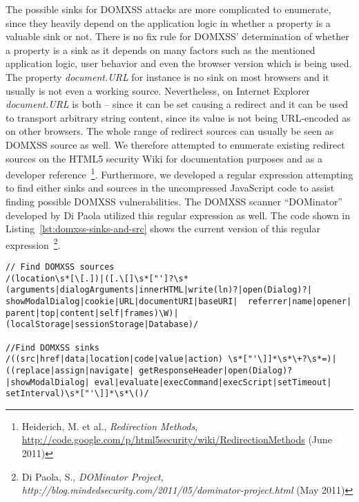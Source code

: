     The possible sinks for DOMXSS attacks are more complicated to enumerate, since they heavily depend on the application logic in whether a property is a valuable sink or not. There is no fix rule for DOMXSS' determination of whether a property is a sink as it depends on many factors such as the mentioned application logic, user behavior and even the browser version which is being used. The property \textit{document.URL} for instance is no sink on most browsers and it usually is not even a working source. Nevertheless, on Internet Explorer \textit{document.URL} is both -- since it can be set causing a redirect and it can be used to transport arbitrary string content, since its value is not being URL-encoded as on other browsers. The whole range of redirect sources can usually be seen as DOMXSS source as well. We therefore attempted to enumerate existing redirect sources on the HTML5 security Wiki for documentation purposes and as a developer reference~\footnote{Heiderich, M. et al., \textit{Redirection 
Methods}, \url{http://code.google.com/p/html5security/wiki/RedirectionMethods} (June 2011)}. Furthermore, we developed a regular expression attempting to find either sinks and sources in the uncompressed JavaScript code to assist finding possible DOMXSS vulnerabilities. The DOMXSS scanner ``DOMinator'' developed by Di Paola utilized this regular expression as well. The code shown in Listing~\ref{lst:domxss-sinks-and-src} shows the current version of this regular expression~\footnote{Di Paola, S., \textit{DOMinator Project}, \textit{http://blog.mindedsecurity.com/2011/05/dominator-project.html} (May 2011)}.

\begin{lstlisting}[label=lst:domxss-sinks-and-src,caption=Regular expressions to help finding DOMXSS vulnerabilities; common sources and sinks are being identified,captionpos=b]
// Find DOMXSS sources
/(location\s*[\[.])|([.\[]\s*["']?\s* (arguments|dialogArguments|innerHTML|write(ln)?|open(Dialog)?| showModalDialog|cookie|URL|documentURI|baseURI|  referrer|name|opener| parent|top|content|self|frames)\W)| (localStorage|sessionStorage|Database)/ 

//Find DOMXSS sinks
/((src|href|data|location|code|value|action) \s*["'\]]*\s*\+?\s*=)|((replace|assign|navigate| getResponseHeader|open(Dialog)?|showModalDialog| eval|evaluate|execCommand|execScript|setTimeout| setInterval)\s*["'\]]*\s*\()/
\end{lstlisting}


